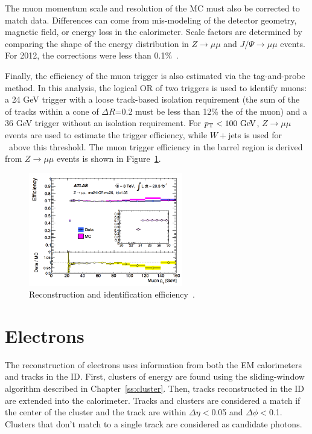 The muon momentum scale and resolution of the MC must also be corrected to match data. Differences can come from mis-modeling of the detector geometry, magnetic field, or energy loss in the calorimeter. Scale factors are determined by comparing the shape of the energy distribution in $Z\rightarrow \mu\mu$ and $J/\Psi\rightarrow \mu\mu$ events. For 2012, the corrections were less than 0.1\%~\cite{muonpaper}.

Finally, the efficiency of the muon trigger is also estimated via the tag-and-probe method. In this analysis, the logical OR of two triggers is used to identify muons: a 24 GeV trigger with a loose track-based isolation requirement (the sum of the \pt of tracks within a cone of $\Delta R$=0.2 must be less than 12\% the \pt of the muon) and a 36 GeV trigger without an isolation requirement. For $\pt<100 \gev$, $Z\rightarrow\mu\mu$ events are used to estimate the trigger efficiency, while $W+$jets is used for \pt\ above this threshold. The muon trigger efficiency in the barrel region is derived from $Z\rightarrow\mu\mu$ events is shown in Figure~\ref{fig:muontrigger}.

\begin{figure}[hp]
\centering
\includegraphics[width=0.6\textwidth]{fig/obj/muontrigger.png}
\caption{Reconstruction and identification efficiency~\cite{Aad:2014fxa}.}
\label{fig:muontrigger}
\end{figure}

\section{Electrons}
The reconstruction of electrons uses information from both the EM calorimeters and tracks in the ID. First, clusters of energy are found using the sliding-window algorithm described in Chapter~\ref{ss:cluster}. Then, tracks reconstructed in the ID are extended into the calorimeter. Tracks and clusters are considered a match if the center of the cluster and the track are within $\Delta\eta<$0.05 and $\Delta\phi<$0.1. Clusters that don't match to a single track are considered as candidate photons. 

